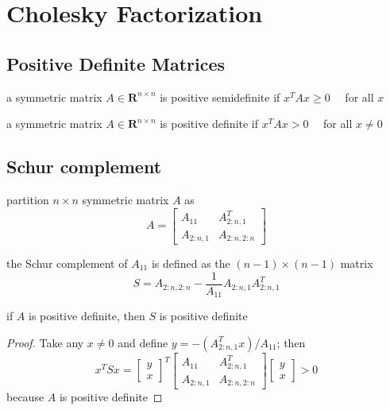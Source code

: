 \chapter{Cholesky Factorization}

\section{Positive Definite Matrices}

\begin{definition}
    a symmetric matrix $ A \in \mathbf{R}^{n \times n} $ is positive semidefinite if $ x^{T} A x \geq 0 \quad $ for all $ x $

\end{definition}

\begin{definition}
    a symmetric matrix $ A \in \mathbf{R}^{n \times n} $ is positive definite if $ x^{T} A x>0 \quad $ for all $ x \neq 0 $
\end{definition}

\section{Schur complement}

\begin{definition}
    partition $ n \times n $ symmetric matrix $ A $ as
\begin{equation}
A=\left[\begin{array}{cc}
A_{11} & A_{2: n, 1}^{T} \\
A_{2: n, 1} & A_{2: n, 2: n}
\end{array}\right]
\end{equation}

the Schur complement of $ A_{11} $ is defined as the $ (n-1) \times(n-1) $ matrix
\begin{equation}
S=A_{2: n, 2: n}-\frac{1}{A_{11}} A_{2: n, 1} A_{2: n, 1}^{T}
\end{equation}
\end{definition}

\begin{theorem}
    if $ A $ is positive definite, then $ S $ is positive definite
\end{theorem}

\begin{proof}
    Take any $ x \neq 0 $ and define $ y=-\left(A_{2: n, 1}^{T} x\right) / A_{11} $; then
\begin{equation}
x^{T} S x=\left[\begin{array}{l}
y \\
x
\end{array}\right]^{T}\left[\begin{array}{cc}
A_{11} & A_{2: n, 1}^{T} \\
A_{2: n, 1} & A_{2: n, 2: n}
\end{array}\right]\left[\begin{array}{l}
y \\
x
\end{array}\right]>0
\end{equation}
because $ A $ is positive definite
\end{proof}

